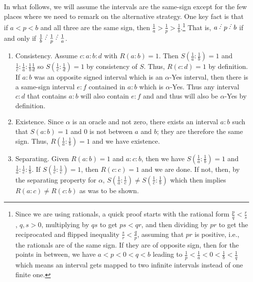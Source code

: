 \documentclass[12pt]{article}
\begin{document}
\begin{itemize}
    In what follows, we will assume the intervals are the same-sign except for the few places where we need to remark on the alternative strategy. One key fact is that if $a<p<b$ and all three are the same sign, then $\frac{1}{a} > \frac{1}{p} > \frac{1}{b}$.\footnote{Since we are using rationals, a quick proof starts with the rational form $\frac{p}{q} < \frac{r}{s}$, $q, s > 0$, multiplying by $qs$ to get $ps < qr$, and then dividing by $pr$ to get the reciprocated and flipped inequality $\frac{s}{r} < \frac{q}{p}$, assuming that $pr$ is positive, i.e., the rationals are of the same sign. If they are of opposite sign, then for the points in between, we have $a < p < 0< q< b$ leading to $\frac{1}{p} < \frac{1}{a} < 0 < \frac{1}{b} < \frac{1}{q}$ which means an interval gets mapped to two infinite intervals instead of one finite one.} That is, $a\lte p\lte b$ if and only if $\frac{1}{b} \lte \frac{1}{p}\lte \frac{1}{a}$.
    
    \begin{enumerate}
        \item Consistency. Assume $c: a: b: d $ with $R(a:b)=1$. Then $S(\frac{1}{a}:\frac{1}{b}) = 1$ and $\frac{1}{c}:\frac{1}{a}:\frac{1}{b}\frac{1}{d}$ so $S(\frac{1}{c}:\frac{1}{d})=1$ by consistency of $S$. Thus, $R(c:d) = 1$ by definition. If $a:b$ was an opposite signed interval which is an $\alpha$-Yes interval, then there is a same-sign interval $e:f$ contained in $a:b$ which is $\alpha$-Yes. Thus any interval $c:d$ that contains $a:b$ will also contain $e:f$ and and thus will also be $\alpha$-Yes by definition. 
        \item Existence. Since $\alpha$ is an oracle and not zero, there exists an interval $a:b$ such that $S(a:b)=1$ and 0 is not between $a$ and $b$; they are therefore the same sign. Thus, $R(\frac{1}{a}:\frac{1}{b})=1$ and we have existence. 
        \item Separating. Given $R(a:b)=1$ and $a:c:b$, then we have $S(\frac{1}{a}:\frac{1}{b})=1$ and $\frac{1}{a}:\frac{1}{c}:\frac{1}{b}$. If $S(\frac{1}{c}:\frac{1}{c})=1$, then $R(c:c)=1$ and we are done. If not, then, by the separating property for $\alpha$,  $S(\frac{1}{a}:\frac{1}{c}) \neq S(\frac{1}{c}:\frac{1}{b})$ which then implies $R(a:c)\neq R(c:b)$ as was to be shown. 
        

\end{enumerate}
\end{itemize}
\end{document}
